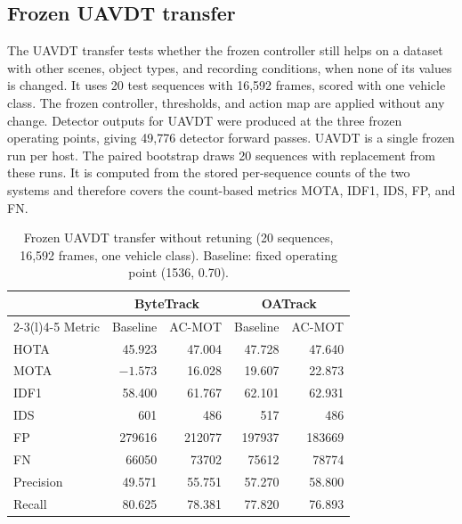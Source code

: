 \documentclass[journal]{new-aiaa}
\begin{document}
\subsection{Frozen UAVDT transfer}
The UAVDT transfer tests whether the frozen controller still helps on a
dataset with other scenes, object types, and recording conditions, when none
of its values is changed. It uses 20 test sequences with 16,592 frames, scored
with one vehicle class. The frozen controller, thresholds, and action map are
applied without any change. Detector outputs for UAVDT were produced at the three
frozen operating points, giving 49,776 detector forward passes. UAVDT is a
single frozen run per host. The paired bootstrap draws 20 sequences with
replacement from these runs. It is computed from the stored per-sequence
counts of the two systems and therefore covers the count-based metrics MOTA,
IDF1, IDS, FP, and FN.

\begin{table}[htbp]
\caption{Frozen UAVDT transfer without retuning (20 sequences, 16,592 frames,
one vehicle class). Baseline: fixed operating point (1536, 0.70).}
\label{tab:uavdt}
\centering\footnotesize
\setlength{\tabcolsep}{4pt}
\begin{tabular}{@{}lrrrr@{}}
\toprule
 & \multicolumn{2}{c}{ByteTrack} & \multicolumn{2}{c}{OATrack}\\
\cmidrule(lr){2-3}\cmidrule(l){4-5}
Metric & Baseline & AC-MOT & Baseline & AC-MOT\\
\midrule
HOTA & 45.923 & 47.004 & 47.728 & 47.640\\
MOTA & $-1.573$ & 16.028 & 19.607 & 22.873\\
IDF1 & 58.400 & 61.767 & 62.101 & 62.931\\
IDS & 601 & 486 & 517 & 486\\
FP & 279616 & 212077 & 197937 & 183669\\
FN & 66050 & 73702 & 75612 & 78774\\
Precision & 49.571 & 55.751 & 57.270 & 58.800\\
Recall & 80.625 & 78.381 & 77.820 & 76.893\\
\bottomrule
\end{tabular}
\end{table}
\end{document}
